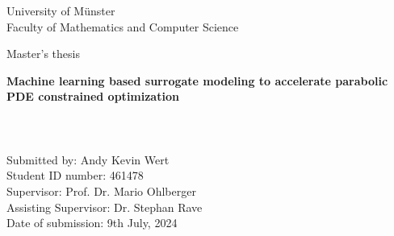 \thispagestyle{empty}
\begin{titlepage}
	 \thispagestyle{empty}
\begin{center}
 \thispagestyle{empty}

$~~$\\
{\large University of Münster}\\
\smallskip
{\large Faculty of Mathematics and Computer Science}
\vfill
{\Large Master's thesis\par}
\vspace{1.5cm}
{\LARGE\bfseries Machine learning based surrogate modeling to accelerate parabolic PDE constrained optimization\par}
\paragraph{}$~~$\\
\paragraph{}$~~$\\
\paragraph{}$~~$\\
{\large Submitted by: Andy Kevin Wert}\\
\medskip
{\large Student ID number: 461478}\\
\medskip
{\large Supervisor: Prof. Dr. Mario Ohlberger}\\
\medskip
{\large Assisting Supervisor: Dr. Stephan Rave}\\
\medskip
{\large Date of submission: 9th July, 2024}\\
\vfill


\end{center}	
\end{titlepage}